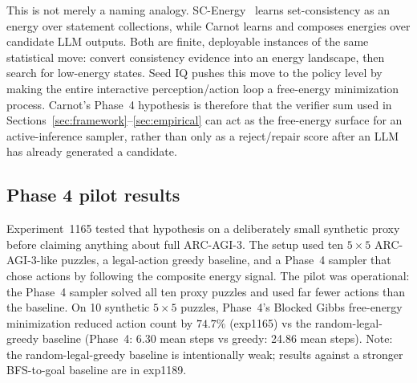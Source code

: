 \documentclass[10pt]{article}
\begin{document}
This is not merely a naming analogy. SC-Energy~\cite{scenergyacl2025}
learns set-consistency as an energy over statement collections,
while Carnot learns and composes energies over candidate LLM
outputs. Both are finite, deployable instances of the same
statistical move: convert consistency evidence into an energy
landscape, then search for low-energy states. Seed IQ pushes this
move to the policy level by making the entire interactive
perception/action loop a free-energy minimization process. Carnot's
Phase~4 hypothesis is therefore that the verifier sum used in
Sections~\ref{sec:framework}--\ref{sec:empirical} can act as the
free-energy surface for an active-inference sampler, rather than
only as a reject/repair score after an LLM has already generated a
candidate.

\subsection{Phase 4 pilot results}

Experiment~1165 tested that hypothesis on a deliberately small
synthetic proxy before claiming anything about full ARC-AGI-3. The
setup used ten $5\times5$ ARC-AGI-3-like puzzles, a legal-action
greedy baseline, and a Phase~4 sampler that chose actions by
following the composite energy signal. The pilot was operational:
the Phase~4 sampler solved all ten proxy puzzles and used far fewer
actions than the baseline. On 10 synthetic $5\times5$ puzzles,
Phase~4's Blocked Gibbs free-energy minimization reduced action count
by $74.7\%$ (exp1165) vs the random-legal-greedy baseline (Phase~4: 6.30 mean
steps vs greedy: 24.86 mean steps). Note: the random-legal-greedy
baseline is intentionally weak; results against a stronger
BFS-to-goal baseline are in exp1189.
\end{document}
